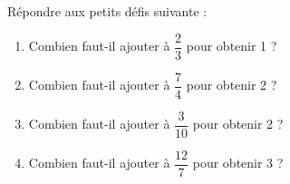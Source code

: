 \begin{exercice*}
   Répondre aux petits défis suivante : \medskip
   \begin{enumerate}
      \item Combien faut-il ajouter à $\dfrac23$ pour obtenir 1 ? \bigskip
      \item Combien faut-il ajouter à $\dfrac74$ pour obtenir 2 ? \bigskip
      \item Combien faut-il ajouter à $\dfrac3{10}$ pour obtenir 2 ? \bigskip
      \item Combien faut-il ajouter à $\dfrac{12}7$ pour obtenir 3 ? \bigskip
   \end{enumerate}
\end{exercice*}